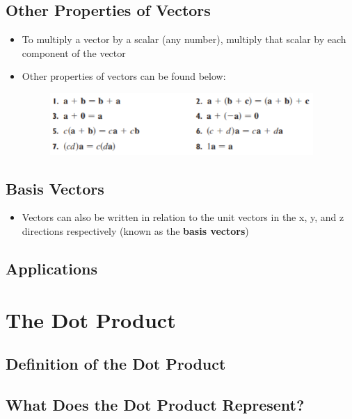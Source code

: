 \documentclass{package/notes}
\begin{document}
\subsection{Other Properties of Vectors}
\begin{itemize}
	\item To multiply a vector by a scalar (any number), multiply that scalar by each component of the vector
	\item Other properties of vectors can be found below: 
	
	\begin{figure}[h]
		\begin{center}
			\includegraphics[width=10cm]{images/1.2.1_Image.PNG}
		\end{center}
	\end{figure}
\end{itemize}

\subsection{Basis Vectors}
\begin{itemize}
	\item Vectors can also be written in relation to the unit vectors in the x, y, and z directions respectively (known as the \textbf{basis vectors})
\end{itemize}



\subsection{Applications}



\section{The Dot Product}

\subsection{Definition of the Dot Product}

\subsection{What Does the Dot Product Represent?}
\end{document}
